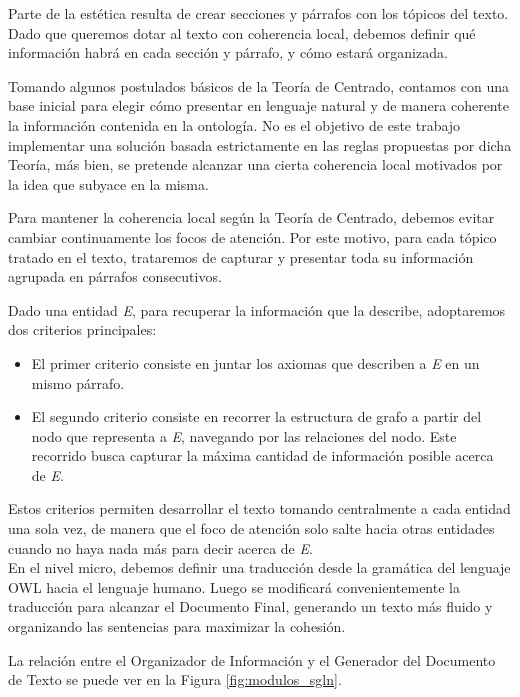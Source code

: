Parte de la estética resulta de crear secciones y párrafos con los tópicos del texto. Dado que queremos dotar al texto con coherencia local, debemos definir qué información habrá en cada sección y párrafo, y cómo estará organizada. 

Tomando algunos postulados básicos de la Teoría de Centrado, contamos con una base inicial para elegir cómo presentar en lenguaje natural y de manera coherente la información contenida en la ontología. No es el objetivo de este trabajo implementar una solución basada estrictamente en las reglas propuestas por dicha Teoría, más bien, se pretende alcanzar una cierta coherencia local motivados por la idea que subyace en la misma.

Para mantener la coherencia local según la Teoría de Centrado, debemos evitar cambiar continuamente los focos de atención. Por este motivo, para cada tópico tratado en el texto, trataremos de capturar y presentar toda su información agrupada en párrafos consecutivos.  

Dado una entidad \emph{E}, para recuperar la información que la describe, adoptaremos dos criterios principales:
\begin{itemize}
    \item El primer criterio consiste en juntar los axiomas que describen a \emph{E} en un mismo párrafo. %
    \item El segundo criterio consiste en recorrer la estructura de grafo a partir del nodo que representa a \emph{E}, navegando por las relaciones del nodo. Este recorrido busca capturar la máxima cantidad de información posible acerca de \emph{E}. 
\end{itemize}

Estos criterios permiten desarrollar el texto tomando centralmente a cada entidad una sola vez, de manera que el foco de atención solo salte hacia otras entidades cuando no haya nada más para decir acerca de \emph{E}.
\\

En el nivel micro, debemos definir una traducción desde la gramática del lenguaje OWL hacia el lenguaje humano. Luego se modificará convenientemente la traducción para alcanzar el Documento Final, generando un texto más fluido y organizando las sentencias para maximizar la cohesión.

La relación entre el Organizador de Información y el Generador del Documento de Texto se puede ver en la Figura \ref{fig:modulos_sgln}.

